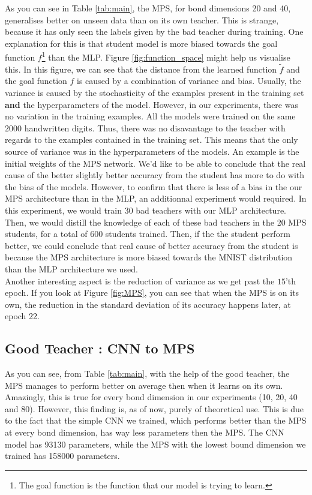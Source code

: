 \documentclass{article}
\theoremstyle{definition}
\theoremstyle{definition}
\begin{document}
As you can see in Table \ref{tab:main}, the MPS, for bond dimensions 20 and 40,  generalises better on unseen data than on its own teacher. This is strange, because it has only seen the labels given by the bad teacher during training. One explanation for this is that student model is more biased towards the goal function $f$\footnote{The goal function is the function that our model is trying to learn.} than the MLP. Figure \ref{fig:function_space} might help us visualise this. In this figure, we can see that the distance from the learned function $\tilde{f}$ and the goal function $f$ is caused by a combination of variance and bias. Usually, the variance is caused by the stochasticity of the examples present in the training set {\bf and} the hyperparameters of the model. However, in our experiments, there was no variation in the training examples. All the models were trained on the same $2000$ handwritten digits. Thus, there was no disavantage to the teacher with regards to the examples contained in the training set. This means that the only source of variance was in the hyperparameters of the models. An example is the initial weights of the MPS network. We'd like to be able to conclude that the real cause of the better slightly better accuracy from the student has more to do with the bias of the models. However, to confirm that there is less of a bias in the our MPS architecture than in the MLP, an additionnal experiment would required. In this experiment, we would train $30$ bad teachers with our MLP architecture. Then, we would distill the knowledge of each of these bad teachers in the 20 MPS students, for a total of $600$ students trained. Then, if the the student perform better, we could conclude that real cause of better accuracy from the student is because the MPS architecture is more biased towards the MNIST distribution than the MLP architecture we used. \\ Another interesting aspect is the reduction of variance as we get past the $15$'th epoch. If you look at Figure \ref{fig:MPS}, you can see that when the MPS is on its own, the reduction in the standard deviation of its accuracy happens later, at epoch 22.


\subsection{Good Teacher : CNN to MPS}
As you can see, from Table \ref{tab:main}, with the help of the good teacher, the MPS manages to perform better on average then when it learns on its own. Amazingly, this is true for every bond dimension in our experiments (10, 20, 40 and 80). However, this finding is, as of now, purely of theoretical use. This is due to the fact that the simple CNN we trained, which performs better than the MPS at every bond dimension, has way less parameters then the MPS. The CNN model has 93130 parameters, while the MPS with the lowest bound dimension we trained has 158000 parameters.\\
\end{document}
